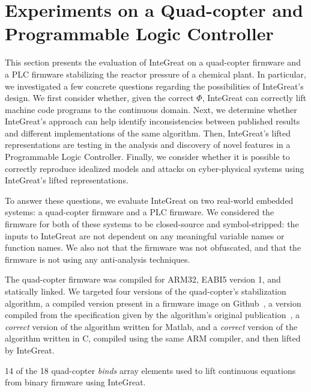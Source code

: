 \section{Experiments on a Quad-copter and Programmable Logic Controller}

This section presents the evaluation of InteGreat on a quad-copter firmware and a PLC firmware stabilizing the reactor pressure of a chemical plant.
In particular, we investigated a few concrete questions regarding the possibilities of InteGreat's design.
We first consider whether, given the correct $\Phi$, InteGreat can correctly lift machine code programs to the continuous domain.
Next, we determine whether InteGreat's approach can help identify inconsistencies between published results and different implementations of the same algorithm.
Then, InteGreat's lifted representations are testing in the analysis and discovery of novel features in a Programmable Logic Controller.
Finally, we consider whether it is possible to correctly reproduce idealized models and attacks on cyber-physical systems using InteGreat's lifted representations.

To answer these questions, we evaluate InteGreat on two real-world embedded systems: a quad-copter firmware and a PLC firmware.
We considered the firmware for both of these systems to be closed-source and symbol-stripped: the inputs to InteGreat are not dependent on any meaningful variable names or function names.
We also not that the firmware was not obfuscated, and that the firmware is not using any anti-analysis techniques.



The quad-copter firmware was compiled for ARM32, EABI5 version 1, and statically linked.
We targeted four versions of the quad-copter's stabilization algorithm, a compiled version present in a firmware image on Github~\cite{drone}, a version compiled from the specification given by the algorithm's original publication~\cite{madgwick}, a \emph{correct} version of the algorithm written for Matlab, and a \emph{correct} version of the algorithm written in C, compiled using the same ARM compiler, and then lifted by InteGreat.

\begin{table}
\caption{14 of the 18 quad-copter \emph{binds} array elements used to lift continuous equations from binary firmware using InteGreat.}
\label{tab:quadcopt-binds}

\end{table}


